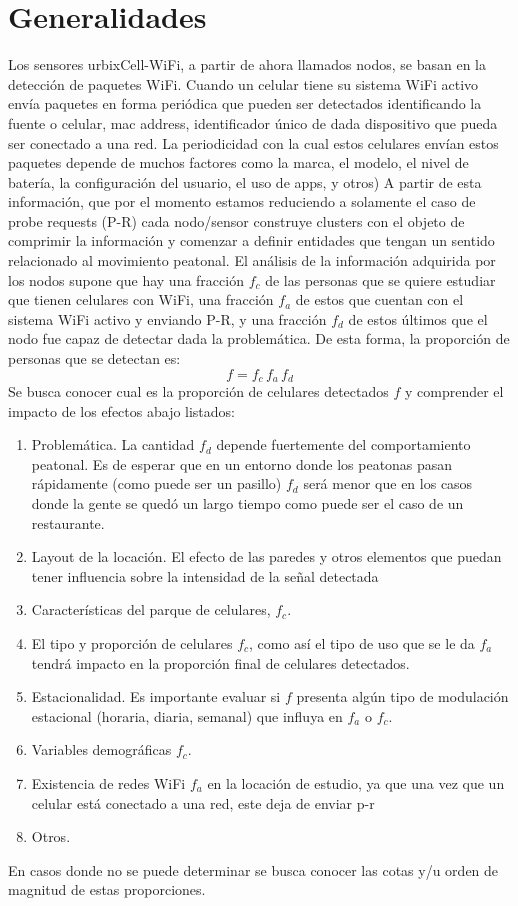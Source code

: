 \section{Generalidades}
Los sensores urbixCell-WiFi, a partir de ahora llamados nodos,
se basan en la detección de paquetes WiFi.
Cuando un celular tiene su sistema WiFi activo
envía paquetes en forma periódica que pueden ser detectados 
identificando la fuente o celular, mac address,
identificador único de dada dispositivo que pueda ser conectado a una red.
La periodicidad con la cual estos celulares
enví­an estos paquetes depende de muchos factores como 
la marca, el modelo, el nivel de batería, 
la configuración del usuario, el uso de apps, y otros)
A partir de esta información, que por el momento estamos reduciendo a solamente el caso de probe requests (P-R)
cada nodo/sensor construye clusters con el objeto de
comprimir la información y comenzar a definir entidades que tengan un sentido relacionado al movimiento peatonal.
El análisis de la información adquirida por los nodos supone que
hay una fracción $f_c$ de las personas que se quiere estudiar que
tienen celulares con WiFi, una fracción $f_a$ de estos que cuentan con
el sistema WiFi activo y enviando P-R, y una fracción $f_d$ de estos últimos que el nodo fue capaz de detectar
dada la problemática.
De esta forma, la proporción de personas que se detectan es:
\[
f = f_c \, f_a \, f_d
\]
Se busca conocer cual es la proporción de celulares detectados $f$
y  comprender el impacto de los efectos abajo listados:
\begin{enumerate}
\item Problemática. La cantidad $f_d$ depende fuertemente del comportamiento peatonal.
Es de esperar que en un entorno donde los peatonas pasan rápidamente (como puede ser un pasillo)
$f_d$ será menor que en los casos donde la gente
se quedó un largo tiempo como puede ser el caso de un restaurante.

\item Layout de la locación. El efecto de las paredes y otros
elementos que puedan tener influencia sobre la intensidad de la señal detectada

\item Características del parque de celulares, $f_c$.

\item El tipo y proporción de celulares $f_c$, como así el tipo de uso que
se le da $f_a$ tendrá impacto en la proporción final de celulares detectados.

\item Estacionalidad. Es importante evaluar si $f$
presenta algún tipo de modulación estacional (horaria, diaria, semanal)
que influya en $f_a$ o $f_c$.

\item Variables demográficas $f_c$.
\item Existencia de redes WiFi $f_a$ en la locación de estudio,
ya que una vez que un celular está conectado a una red, este
deja de enviar p-r
\item Otros.
\end{enumerate}

En casos donde no se puede determinar se busca conocer las cotas y/u orden de magnitud de estas proporciones.

